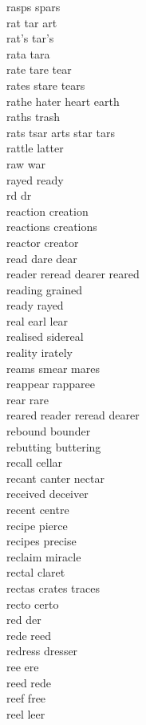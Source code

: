 rasps spars\\
rat tar art\\
rat's tar's\\
rata tara\\
rate tare tear\\
rates stare tears\\
rathe hater heart earth\\
raths trash\\
rats tsar arts star tars\\
rattle latter\\
raw war\\
rayed ready\\
rd dr\\
reaction creation\\
reactions creations\\
reactor creator\\
read dare dear\\
reader reread dearer reared\\
reading grained\\
ready rayed\\
real earl lear\\
realised sidereal\\
reality irately\\
reams smear mares\\
reappear rapparee\\
rear rare\\
reared reader reread dearer\\
rebound bounder\\
rebutting buttering\\
recall cellar\\
recant canter nectar\\
received deceiver\\
recent centre\\
recipe pierce\\
recipes precise\\
reclaim miracle\\
rectal claret\\
rectas crates traces\\
recto certo\\
red der\\
rede reed\\
redress dresser\\
ree ere\\
reed rede\\
reef free\\
reel leer\\
